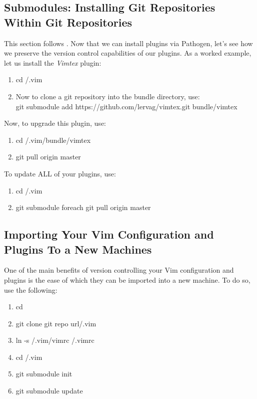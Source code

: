\subsection{Submodules: Installing Git Repositories Within Git Repositories}\label{SecSubmodules}
This section follows \cite{neil2010synchronizing}. Now that we can install
plugins via Pathogen, let's see how we preserve the version control capabilities
of our plugins. As a worked example, let us install the \textit{Vimtex} plugin:
\begin{enumerate}
    \item cd \tsim/.vim
    \item Now to clone a git repository into the bundle directory, use:\\ git
        submodule add https://github.com/lervag/vimtex.git bundle/vimtex
\end{enumerate}
Now, to upgrade this plugin, use:
\begin{enumerate}
    \item cd \tsim/.vim/bundle/vimtex
    \item git pull origin master
\end{enumerate}
To update ALL of your plugins, use:
\begin{enumerate}
    \item cd \tsim/.vim
    \item git submodule foreach git pull origin master
\end{enumerate}
\subsection{Importing Your Vim Configuration and Plugins To a New Machines}
One of the main benefits of version controlling your Vim configuration and
plugins is the ease of which they can be imported into a new machine. To do so,
use the following:
\begin{enumerate}
    \item cd \tsim
    \item git clone \tlangle git repo url\trangle \tsim/.vim
    \item ln -s \tsim/.vim/vimrc \tsim/.vimrc
    \item cd \tsim/.vim
    \item git submodule init
    \item git submodule update
\end{enumerate}
